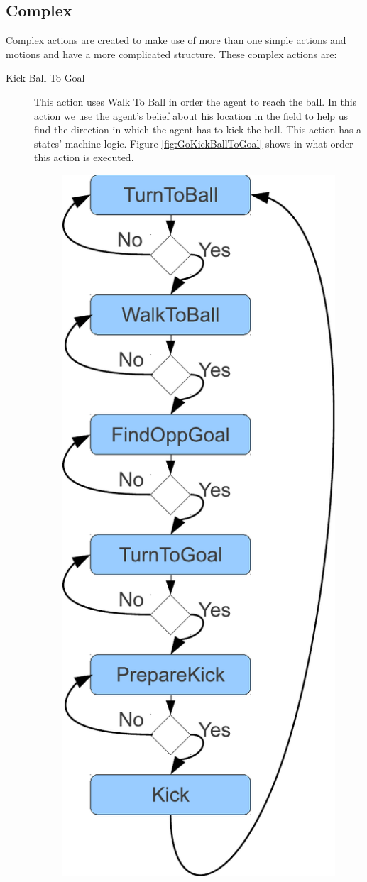 \subsection{Complex}
Complex actions are created to make use of more than one simple actions and motions and have a more complicated structure. These complex actions are:
\begin{description}
 \item[Kick Ball To Goal] This action uses Walk To Ball in order the agent to reach the ball. In this action we use the agent's belief about his location in the field to help us find the direction in which the agent has to kick the ball. This action has a states' machine logic. Figure \ref{fig:GoKickBallToGoal} shows in what order this action is executed.
 \begin{figure}[!h]
\centering
  \includegraphics[scale=0.5]{Chapter3/figures/KickFSM.pdf}

\end{figure}
\end{description}
